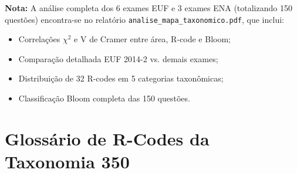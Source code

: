 \documentclass[12pt,a4paper]{article}
\begin{document}
\medskip
\noindent\textbf{Nota:} A análise completa dos 6 exames EUF e 3 exames ENA
(totalizando 150 questões) encontra-se no relatório
\texttt{analise\_mapa\_taxonomico.pdf}, que inclui:
\begin{itemize}
  \item Correlações $\chi^2$ e V de Cramer entre área, R-code e Bloom;
  \item Comparação detalhada EUF 2014-2 vs. demais exames;
  \item Distribuição de 32 R-codes em 5 categorias taxonômicas;
  \item Classificação Bloom completa das 150 questões.
\end{itemize}

\newpage
\appendix
\section{Glossário de R-Codes da Taxonomia 350}
\end{document}
